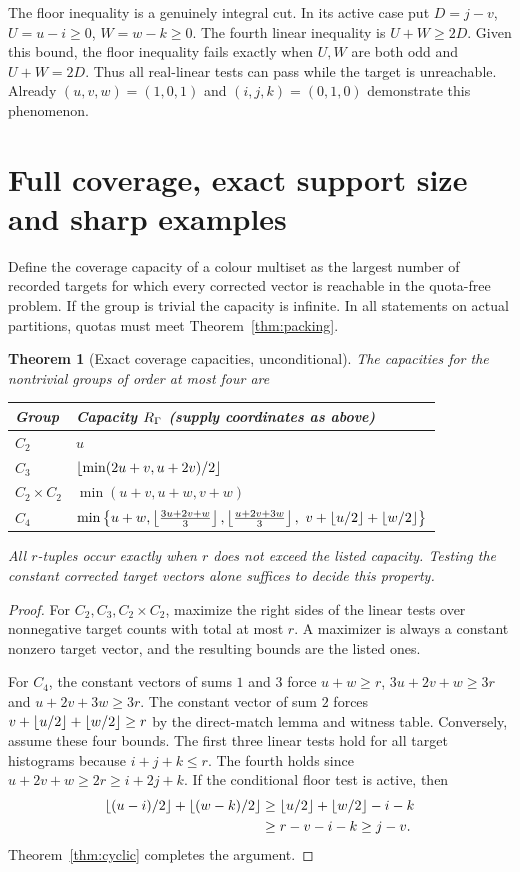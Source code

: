 \documentclass[11pt]{article}
\newtheorem{theorem}{Theorem}[section]
\theoremstyle{remark}\newtheorem{remark}[theorem]{Remark}
\begin{document}
The floor inequality is a genuinely integral cut. In its active case put $D=j-v$, $U=u-i\ge0$, $W=w-k\ge0$. The fourth linear inequality is $U+W\ge2D$. Given this bound, the floor inequality fails exactly when $U,W$ are both odd and $U+W=2D$. Thus all real-linear tests can pass while the target is unreachable. Already $(u,v,w)=(1,0,1)$ and $(i,j,k)=(0,1,0)$ demonstrate this phenomenon.

\section{Full coverage, exact support size and sharp examples}\label{sec:coverage}
Define the coverage capacity of a colour multiset as the largest number of recorded targets for which every corrected vector is reachable in the quota-free problem. If the group is trivial the capacity is infinite. In all statements on actual partitions, quotas must meet Theorem~\ref{thm:packing}.

\begin{theorem}[Exact coverage capacities, unconditional]\label{thm:capacity}
The capacities for the nontrivial groups of order at most four are
\begin{center}
\begin{tabular}{@{}ll@{}}
\toprule
Group & Capacity $R_\Gamma$ (supply coordinates as above)\\
\midrule
$C_2$ & $u$\\
$C_3$ & $\left\lfloor \min(2u+v,u+2v)/2\right\rfloor$\\
$C_2\times C_2$ & $\min(u+v,u+w,v+w)$\\
$C_4$ & $\min\left\{u+w,\floor{\frac{3u+2v+w}{3}},\floor{\frac{u+2v+3w}{3}},\ v+\floor{u/2}+\floor{w/2}\right\}$\\
\bottomrule
\end{tabular}
\end{center}
All $r$-tuples occur exactly when $r$ does not exceed the listed capacity. Testing the constant corrected target vectors alone suffices to decide this property.
\end{theorem}
\begin{proof}
For $C_2,C_3,C_2\times C_2$, maximize the right sides of the linear tests over nonnegative target counts with total at most $r$. A maximizer is always a constant nonzero target vector, and the resulting bounds are the listed ones.

For $C_4$, the constant vectors of sums $1$ and $3$ force $u+w\ge r$, $3u+2v+w\ge3r$ and $u+2v+3w\ge3r$. The constant vector of sum $2$ forces $v+\left\lfloor u/2\right\rfloor+\left\lfloor w/2\right\rfloor\ge r$ by the direct-match lemma and witness table. Conversely, assume these four bounds. The first three linear tests hold for all target histograms because $i+j+k\le r$. The fourth holds since $u+2v+w\ge2r\ge i+2j+k$. If the conditional floor test is active, then
\begin{align*}
 \left\lfloor (u-i)/2\right\rfloor+\left\lfloor (w-k)/2\right\rfloor
 &\ge \left\lfloor u/2\right\rfloor+\left\lfloor w/2\right\rfloor-i-k\\
 &\ge r-v-i-k\ge j-v.
\end{align*}
Theorem~\ref{thm:cyclic} completes the argument.
\end{proof}
\end{document}
